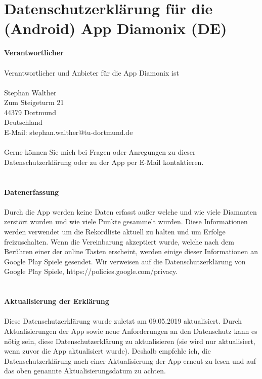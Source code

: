 \documentclass[a4paper,12pt]{article}
\begin{document}
\section{Datenschutzerkl\"arung f\"ur die (Android) App Diamonix (DE)}\normalsize
\bigskip
\textbf{Verantwortlicher} \\
\\
Verantwortlicher und Anbieter f\"ur die App Diamonix ist \\
\\
Stephan Walther \\
Zum Steigeturm 21 \\
44379 Dortmund \\
Deutschland \\
E-Mail: stephan.walther@tu-dortmund.de \\
\\
Gerne k\"onnen Sie mich bei Fragen oder Anregungen zu dieser Datenschutzerkl\"arung oder
zu der App per E-Mail kontaktieren. \\
\\
\\
\textbf{Datenerfassung} \\
\\
Durch die App werden keine Daten erfasst au{\ss}er welche und wie viele Diamanten
zerst\"ort wurden und wie viele Punkte gesammelt wurden.
Diese Informationen werden verwendet
um die Rekordliste aktuell zu halten und um Erfolge freizuschalten. Wenn
die Vereinbarung akzeptiert wurde, welche nach dem Ber\"uhren einer der online 
Tasten erscheint, werden einige dieser Informationen an Google Play Spiele gesendet.
Wir verweisen auf die Datenschutzerkl\"arung von Google Play Spiele,
https://policies.google.com/privacy. \\
\\
\\
\textbf{Aktualisierung der Erkl\"arung} \\
\\
Diese Datenschutzerkl\"arung wurde zuletzt am 09.05.2019 aktualisiert.
Durch Aktualisierungen der App sowie neue Anforderungen an den Datenschutz kann es n\"otig sein, diese Datenschutzerkl\"arung zu aktualisieren (sie wird nur aktualisiert, wenn zuvor die App aktualisiert wurde). Deshalb empfehle ich, die Datenschutzerkl\"arung nach einer Aktualisierung der App erneut zu lesen und auf das oben genannte Aktualisierungsdatum zu achten.
\end{document}
